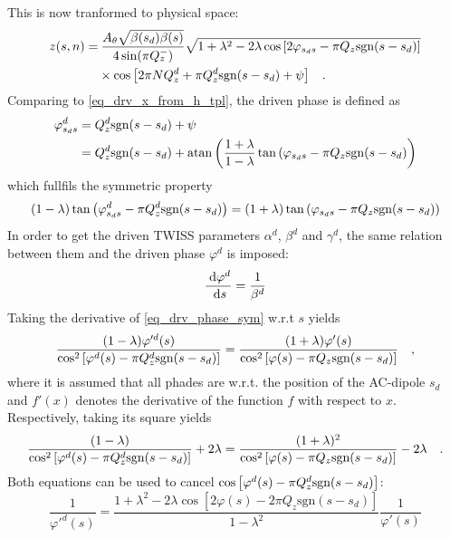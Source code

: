 %
This is now tranformed to physical space:
%
\begin{align}
  z(s,n) =&\:
  \frac{A_\theta\sqrt{\beta(s_d)\beta(s)}}{4\sin(\pi Q_z^-)}
  \sqrt{1+\lambda^2-2\lambda\cos\left[2\varphi_{s_ds} - \pi Q_z\text{sgn}(s-s_d)\right]} \notag \\
  &\times\cos{\left[ 2\pi N Q^{d}_{z} + \pi Q^{d}_{z}\text{sgn}(s-s_d) + \psi \right]}
  \quad .
  \label{eq_z_drv}
\end{align}
%
Comparing to \eqref{eq_drv_x_from_h_tpl}, the driven phase is defined as 
%
\begin{align}
  \varphi^d_{s_ds} &=  Q^{d}_{z}\text{sgn}(s-s_d) + \psi\notag\\
  &=  Q^{d}_{z}\text{sgn}(s-s_d)
  + \mathrm{atan}\left( \frac{1+\lambda}{1-\lambda}\tan\left( \varphi_{s_ds}-\pi Q_z\text{sgn}(s-s_d \right) \right)
\end{align}
%
which fullfils the symmetric property
%
\begin{equation}
  (1-\lambda)\tan\left( \varphi^d_{s_ds} -\pi Q^{d}_{z}\text{sgn}(s-s_d) \right)
  =
  (1+\lambda)\tan\left( \varphi_{s_ds} -\pi Q_z\text{sgn}(s-s_d) \right)
  \label{eq_drv_phase_sym}
\end{equation}
%
In order to get the driven TWISS parameters $\alpha^d$, $\beta^d$ and $\gamma^d$, the same relation
between them and the driven phase $\varphi^d$ is imposed:
\begin{equation}
  \frac{\;\text{d} \varphi^d}{\;\text{d} s} = \frac{1}{\beta^d}
\end{equation}
%
Taking the derivative of  \eqref{eq_drv_phase_sym} w.r.t $s$ yields
%
\begin{equation}
  \frac{(1-\lambda)\varphi'^d(s)}{\cos^2\left[ \varphi^d(s) - \pi Q^{d}_{z}\text{sgn}(s-s_d) \right]}
  =
  \frac{(1+\lambda)\varphi'(s)}{\cos^2\left[ \varphi(s) - \pi Q_z\text{sgn}(s-s_d) \right]}
  \quad ,
\end{equation}
%
where it is assumed that all phades are w.r.t. the position of the AC-dipole $s_d$ and $f'(x)$ denotes
the derivative of the function $f$ with respect to $x$.
Respectively, taking its square yields
\begin{equation}
  \frac{(1-\lambda)}{\cos^2\left[ \varphi^d(s) - \pi Q^{d}_{z}\text{sgn}(s-s_d) \right]} +2\lambda
  =
  \frac{(1+\lambda)^2}{\cos^2\left[ \varphi(s) - \pi Q_z\text{sgn}(s-s_d) \right]} -2\lambda
  \quad .
  \label{<+label+>}
\end{equation}
%
Both equations can be used to cancel $\cos\left[ \varphi^d(s) - \pi Q^{d}_{z}\text{sgn}(s-s_d) \right]$:
%
\begin{equation}
  \frac{1}{\varphi'^d(s)} = 
  \frac{1+\lambda^2-2\lambda\cos\left[ 2\varphi(s) - 2\pi Q_z\text{sgn}(s-s_d)\right]}{1-\lambda^2}
  \frac{1}{\varphi'(s)}
\end{equation}
